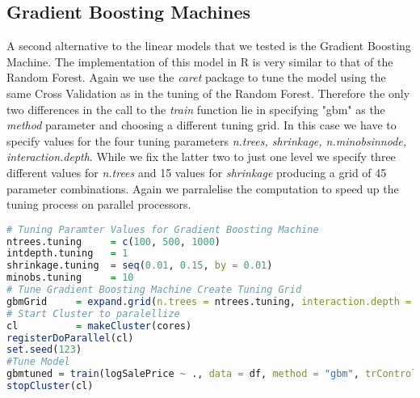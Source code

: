 \subsection{Gradient Boosting Machines}
A second alternative to the linear models that we tested is the Gradient Boosting Machine. The implementation of this model in R is very similar to that of the Random Forest. Again we use the \textit{caret} package to tune the model using the same Cross Validation as in the tuning of the Random Forest. Therefore the only two differences in the call to the \textit{train} function lie in specifying "gbm" as the \textit{method} parameter and choosing a different tuning grid. In this case we have to specify values for the four tuning parameters \textit{n.trees, shrinkage, n.minobsinnode, interaction.depth}. While we fix the latter two to just one level we specify three different values for \textit{n.trees} and 15 values for \textit{shrinkage} producing a grid of 45 parameter combinations.
Again we parralelise the computation to speed up the tuning process on parallel processors.

\begin{lstlisting}[language=R]
# Tuning Paramter Values for Gradient Boosting Machine
ntrees.tuning     = c(100, 500, 1000)
intdepth.tuning   = 1
shrinkage.tuning  = seq(0.01, 0.15, by = 0.01)
minobs.tuning     = 10
# Tune Gradient Boosting Machine Create Tuning Grid
gbmGrid     = expand.grid(n.trees = ntrees.tuning, interaction.depth = intdepth.tuning, shrinkage = shrinkage.tuning, n.minobsinnode = minobs.tuning)
# Start Cluster to paralellize
cl          = makeCluster(cores)
registerDoParallel(cl)
set.seed(123)
#Tune Model
gbmtuned = train(logSalePrice ~ ., data = df, method = "gbm", trControl = CrossValidation, verbose = TRUE, tuneGrid = gbmGrid)
stopCluster(cl)
\end{lstlisting}